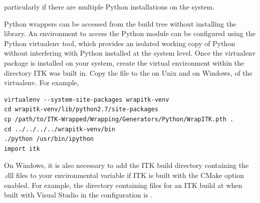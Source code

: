 particularly if there are multiple Python installations on the system.

Python wrappers can be accessed from the build tree without installing the
library. An environment to access the  Python module can be configured
using the Python virtualenv tool, which provides an isolated working copy of
Python without interfering with Python installed at the system level. Once the
virtualenv package is installed on your system, create the virtual environment
within the directory ITK was built in. Copy the  file to
the  on Unix and  on
Windows, of the virtualenv. For example,

\small
\begin{verbatim}
virtualenv --system-site-packages wrapitk-venv
cd wrapitk-venv/lib/python2.7/site-packages
cp /path/to/ITK-Wrapped/Wrapping/Generators/Python/WrapITK.pth .
cd ../../../../wrapitk-venv/bin
./python /usr/bin/ipython
import itk
\end{verbatim}
\normalsize

On Windows, it is also necessary to add the ITK build directory containing the
.dll files to your  environmental variable if ITK is built with the
CMake option  enabled. For example, the directory
containing  files for an ITK build at
 when built with Visual Studio in the
 configuration is
.

